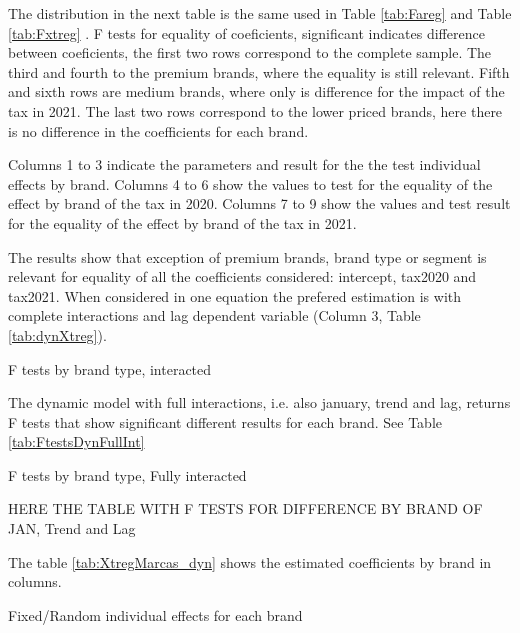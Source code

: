 \documentclass[]{article}
\begin{document}
The distribution in the next table is the same used in Table \ref{tab:Fareg} and Table \ref{tab:Fxtreg} . F tests for equality of coeficients, significant indicates difference between coeficients, the first two rows correspond to the complete sample. The third and fourth to the premium brands, where the equality is still relevant. Fifth and sixth rows are medium brands, where only is difference for the impact of the tax in 2021. The last two rows correspond to the lower priced brands, here there is no difference in the coefficients for each brand.

Columns 1 to 3 indicate the parameters and result for the the test individual effects by brand. Columns 4 to 6 show the values to test for the equality of the effect by brand of the tax in 2020. Columns 7 to 9 show the values and test result for the equality of the effect by brand of the tax in 2021.
 
The results show that exception of premium brands, brand type or segment is relevant for equality of all the coefficients considered: intercept, tax2020 and tax2021. When considered in one equation the prefered estimation is with complete interactions and lag dependent variable (Column 3, Table \ref{tab:dynXtreg}).
 
\begin{landscape}
\begin{table}[ht]
	\centering
	\caption{F tests by brand type, interacted \label{tab:FtestsDyn}} 
	
\end{table}
\end{landscape}
 
The dynamic model with full interactions, i.e. also january, trend and lag, returns F tests that show significant different results for each brand. See Table \ref{tab:FtestsDynFullInt} 

\begin{landscape}
	\begin{table}[ht]
		\centering
		\caption{F tests by brand type, Fully interacted \label{tab:FtestsDynFullInt}} 
HERE THE TABLE WITH F TESTS FOR DIFFERENCE BY BRAND OF JAN, Trend and Lag 	\end{table}
\end{landscape}

The table \ref{tab:XtregMarcas_dyn} shows the estimated coefficients by brand in columns.

\begin{landscape}
	\begin{table}[ht]
		\centering
		\caption{Fixed/Random individual effects for each brand \label{tab:XtregMarcas_dyn}}
		
	\end{table}
\end{landscape}
\end{document}
